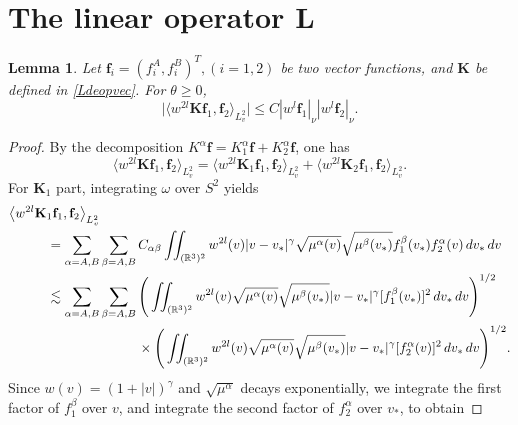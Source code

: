 \documentclass[reqno]{amsart}
\numberwithin{equation}{section}
\numberwithin{equation}{section}
\newtheorem{lema}[thm]{Lemma}
\begin{document}
	
	\section{The linear operator $\mathbf{L}$}
	
	
	\begin{lema}\label{lemma2.1}
		Let $\mathbf{f}_i=(f^A_i,f^B_i)^T, (i=1,2)$ be two vector functions, and $\mathbf{K}$ be defined in \eqref{Ldeopvec}. For $\theta\geq0$,
		\begin{equation}\label{socaed1616}
			\big|\big\langle w^{2l}  \mathbf{K} \mathbf{f}_1, \mathbf{f}_2 \big\rangle_{L^{2}_{v}}\big| \leq C |w^{l}\mathbf{f}_1|_{\nu} |w^{l}\mathbf{f}_2|_{\nu}.
		\end{equation}
	\end{lema}
	\begin{proof}
		By the decomposition $K^{\alpha} \mathbf{f}= K_{1}^{\alpha} \mathbf{f}+K_{2}^{\alpha} \mathbf{f}$,  one has 
		\begin{equation*}
			\langle w^{2l}  \mathbf{K} \mathbf{f}_1, \mathbf{f}_2 \rangle_{L^{2}_{v}}=\langle w^{2l}  \mathbf{K}_1 \mathbf{f}_1, \mathbf{f}_2 \rangle_{L^{2}_{v}}+\langle w^{2l}  \mathbf{K}_2 \mathbf{f}_1, \mathbf{f}_2 \rangle_{L^{2}_{v}}.
		\end{equation*}
		For $ \mathbf{K}_1 $ part,  integrating $\omega$ over $   S^2 $ yields
		\begin{equation*}
		\begin{aligned}
			&\big\langle w^{2l} \mathbf{K}_1 \mathbf{f}_1, \mathbf{f}_2 \big\rangle_{L^{2}_{v}} \\
			&\hspace{1cm}= \sum_{\alpha=A,B}\sum_{\beta=A,B} C_{\alpha\beta} \iint_{(\mathbb{R}^3)^2} w^{2l}(v)|v - v_*|^\gamma  \sqrt{\mu^\alpha(v)} \sqrt{\mu^\beta(v_*)}f^\beta_1(v_*)f^\alpha_2(v)\,dv_*\,dv \\
			&\hspace{1cm}\lesssim \sum_{\alpha=A,B}\sum_{\beta=A,B}  \Bigg( \iint_{(\mathbb{R}^3)^2} w^{2l}(v)\sqrt{\mu^\alpha(v)} \sqrt{\mu^\beta(v_*)}|v - v_*|^\gamma [f^\beta_1(v_*)]^2 \,dv_*\,dv \Bigg)^{1/2} \\
			&\hspace{3.4cm} \times \Bigg( \iint_{(\mathbb{R}^3)^2} w^{2l}(v)\sqrt{\mu^\alpha(v)} \sqrt{\mu^\beta(v_*)}|v - v_*|^\gamma [f^\alpha_2(v)]^2 \,dv_*\,dv \Bigg)^{1/2}.
		\end{aligned}
		\end{equation*}
		Since $ w(v) = (1+|v|)^\gamma $ and $ \sqrt{\mu^\alpha} $ decays exponentially, we integrate the first factor of $f^\beta_1$ over $ v $, and integrate the second factor of $f^\alpha_2$ over $ v_* $, to obtain

\end{proof}
\end{document}
